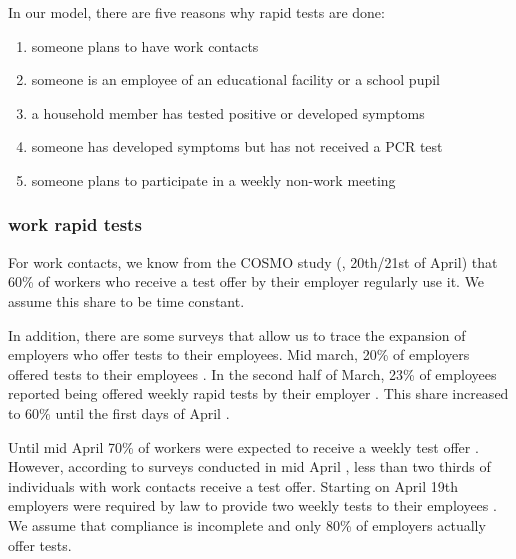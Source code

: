 
In our model, there are five reasons why rapid tests are done:

\begin{enumerate}
    \item someone plans to have work contacts
    \item someone is an employee of an educational facility or a school pupil
    \item a household member has tested positive or developed symptoms
    \item someone has developed symptoms but has not received a PCR test
    \item someone plans to participate in a weekly non-work meeting
\end{enumerate}

\subsubsection{work rapid tests}

For work contacts, we know from the COSMO study (\cite{Betsch2021}, 20th/21st of April)
that 60\% of workers who receive a test offer by their employer regularly use it. We
assume this share to be time constant.

In addition, there are some surveys that allow us to trace the expansion of employers who
offer tests to their employees. Mid march, 20\% of employers offered tests to their
employees \citep{DIHK2021}. In the second half of March, 23\% of employees reported being
offered weekly rapid tests by their employer \citep{Ahlers2021}. This share increased to
60\% until the first days of April \cite{ZDF2021}.


Until mid April 70\% of workers were expected to receive a
weekly test offer \citep{AerzteZeitung2021}. However, according to surveys conducted in
mid April \citep{Betsch2021}, less than two thirds of individuals with work contacts
receive a test offer. Starting on April 19th employers were required by law to provide
two weekly tests to their employees \citep{Bundesanzeiger2021}. We assume that compliance
is incomplete and only 80\% of employers actually offer tests.

